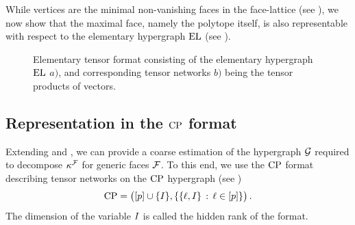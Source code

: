 

While vertices are the minimal non-vanishing faces in the face-lattice (see \cite{ziegler_lectures_2013}), we now show that the maximal face, namely the polytope itself, is also representable with respect to the elementary hypergraph $\mathrm{EL}$ (see ).



\begin{figure}
    
    \caption{Elementary tensor format consisting of the elementary hypergraph $\mathrm{EL}$ $a)$, and corresponding tensor networks $b)$ being the tensor products of vectors.}
    \label{fig:elFormat}
\end{figure}


\subsection{Representation in the $\mathrm{CP}$ format}

Extending  and , we can provide a coarse estimation of the hypergraph $\mathcal{G}$ required to decompose $\kappa^{\mathcal{F}}$ for generic faces $\mathcal{F}$.
To this end, we use the $\mathrm{CP}$ format describing tensor networks on the $\mathrm{CP}$ hypergraph (see )
\begin{align*}
    \mathrm{CP}
    = \big([p]\cup\{I\},\{\{\ell,I\}\,:\,\ell\in[p]\}\big) \, .
\end{align*}
The dimension of the variable $I$ is called the hidden rank of the format.

